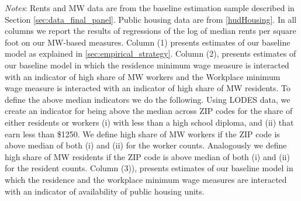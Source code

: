 \begin{table}[hbt!]
    \begin{minipage}{.95\textwidth} \footnotesize
        \vspace{2mm}
        \textit{Notes}: 
        Rents and MW data are from the baseline estimation sample described in Section 
        \ref{sec:data_final_panel}. Public housing data are from \ref{hudHousing}.
        In all columns we report the results of regressions of the log of 
        median rents per square foot on our MW-based measures.
        Column (1) presents estimates of our baseline model as explained in 
        \ref{sec:empirical_strategy}.
        Column (2), presents estimates of our baseline model in which the residence
        minimum wage measure is interacted with an indicator of high share of 
        MW workers and the Workplace minimum wage measure is interacted with an indicator
        of high share of MW residents.
        To define the above median indicators we do the following. Using LODES data, we 
        create an indicator for being above the median across ZIP codes for the share 
        of either residents or workers (i) with less than a high school diploma, and 
        (ii) that earn less than \$1250. We define high share of MW workers if the ZIP
        code is above median of both (i) and (ii) for the worker counts. Analogously we 
        define high share of MW residents if the ZIP code is above median of both (i) 
        and (ii) for the resident counts.
        Column (3)), presents estimates of our baseline model in which the residence and 
        the workplace minimum wage measures are interacted with an indicator of availability 
        of public housing units.
    \end{minipage}
\end{table}
